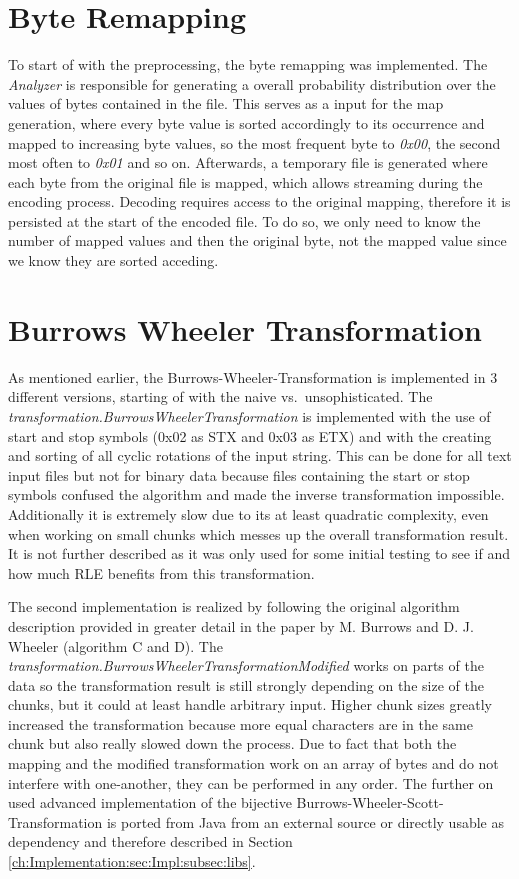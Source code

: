 \section{Byte Remapping}
\label{ch:Implementation:bytemapping}
\par{
	To start of with the preprocessing, the byte remapping was implemented. The \emph{Analyzer} is responsible for generating a overall probability distribution over the values of bytes contained in the file. This serves as a input for the map generation, where every byte value is sorted accordingly to its occurrence and mapped to increasing byte values, so the most frequent byte to \textit{0x00}, the second most often to \textit{0x01} and so on. Afterwards, a temporary file is generated where each byte from the original file is mapped, which allows streaming during the encoding process. Decoding requires access to the original mapping, therefore it is persisted at the start of the encoded file. To do so, we only need to know the number of mapped values and then the original byte, not the mapped value since we know they are sorted acceding.
}
\section{Burrows Wheeler Transformation}
\label{ch:Implementation:bwt}
\par{
	As mentioned earlier, the Burrows-Wheeler-Transformation is implemented in 3 different versions, starting of with the naive vs.\ unsophisticated. The \emph{transformation.BurrowsWheelerTransformation} is implemented with the use of start and stop symbols (0x02 as STX and 0x03 as ETX) and with the creating and sorting of all cyclic rotations of the input string. This can be done for all text input files but not for binary data because files containing the start or stop symbols confused the algorithm and made the inverse transformation impossible. Additionally it is extremely slow due to its at least quadratic complexity, even when working on small chunks which messes up the overall transformation result. It is not further described as it was only used for some initial testing to see if and how much RLE benefits from this transformation. 
}
\par{
	The second implementation is realized by following the original algorithm description provided in greater detail in the paper by M. Burrows and D. J. Wheeler \cite{Burrows94} (algorithm C and D). The \emph{transformation.BurrowsWheelerTransformationModified} works on parts of the data so the transformation result is still strongly depending on the size of the chunks, but it could at least handle arbitrary input. Higher chunk sizes greatly increased the transformation because more equal characters are in the same chunk but also really slowed down the process. Due to fact that both the mapping and the modified transformation work on an array of bytes and do not interfere with one-another, they can be performed in any order. The further on used advanced implementation of the bijective Burrows-Wheeler-Scott-Transformation is ported from Java from an external source or directly usable as dependency and therefore described in Section \ref{ch:Implementation:sec:Impl:subsec:libs}.
}
